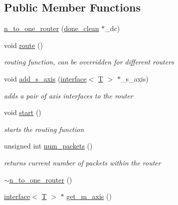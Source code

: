\subsection*{Public Member Functions}
\begin{DoxyCompactItemize}
\item 
\hyperlink{classgalapagos_1_1n__to__one__router_a3fbff119ec60336ceb9b4211da7390c8}{n\+\_\+to\+\_\+one\+\_\+router} (\hyperlink{classgalapagos_1_1done__clean}{done\+\_\+clean} $\ast$\+\_\+dc)
\item 
void \hyperlink{classgalapagos_1_1n__to__one__router_ae4d5a405ad2706d909fd8b261b2ee7f9}{route} ()
\begin{DoxyCompactList}\small\item\em routing function, can be overridden for different routers \end{DoxyCompactList}\item 
void \hyperlink{classgalapagos_1_1n__to__one__router_a9f20fa4aaa47b5aceb838fc19e468854}{add\+\_\+s\+\_\+axis} (\hyperlink{classgalapagos_1_1interface}{interface}$<$ \hyperlink{test_8cpp_a0658ceffa730c765d449bb3d21871b5f}{T} $>$ $\ast$\+\_\+s\+\_\+axis)
\begin{DoxyCompactList}\small\item\em adds a pair of axis interfaces to the router \end{DoxyCompactList}\item 
void \hyperlink{classgalapagos_1_1n__to__one__router_afc25a84a3b345401a91b1c2b7c8484ae}{start} ()
\begin{DoxyCompactList}\small\item\em starts the routing function \end{DoxyCompactList}\item 
unsigned int \hyperlink{classgalapagos_1_1n__to__one__router_ae79a9ee609e42b91f3e8058a0a24fc0c}{num\+\_\+packets} ()
\begin{DoxyCompactList}\small\item\em returns current number of packets within the router \end{DoxyCompactList}\item 
\hyperlink{classgalapagos_1_1n__to__one__router_a1b38ec16587aaa2e3d56ffa5c9afa008}{$\sim$n\+\_\+to\+\_\+one\+\_\+router} ()
\item 
\hyperlink{classgalapagos_1_1interface}{interface}$<$ \hyperlink{test_8cpp_a0658ceffa730c765d449bb3d21871b5f}{T} $>$ $\ast$ \hyperlink{classgalapagos_1_1n__to__one__router_a65b746fb4a20c0260a3b93af0a907be6}{get\+\_\+m\+\_\+axis} ()
\end{DoxyCompactItemize}
